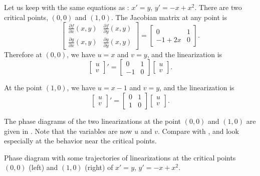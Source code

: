 \begin{example} \label{example:nlin-1b-examplelin}
Let us keep with the same equations as :
$x' = y$, $y' = -x+x^2$.  There are two critical points, $(0,0)$
and $(1,0)$.  The Jacobian matrix at any point is
\begin{equation*}
\begin{bmatrix}
\frac{\partial f}{\partial x}(x,y) &
\frac{\partial f}{\partial y}(x,y) \\
\frac{\partial g}{\partial x}(x,y) &
\frac{\partial g}{\partial y}(x,y)
\end{bmatrix} =
\begin{bmatrix}
0 & 1 \\
-1+2x & 0
\end{bmatrix}.
\end{equation*}
Therefore at $(0,0)$, we have $u=x$ and $v=y$, and the linearization is
\begin{equation*}
\begin{bmatrix} u \\ v \end{bmatrix} ' =
\begin{bmatrix}
0 & 1 \\
-1 & 0
\end{bmatrix}
\begin{bmatrix} u \\ v \end{bmatrix} .
\end{equation*}

At the point $(1,0)$, we have $u=x-1$ and $v=y$, and the linearization is
\begin{equation*}
\begin{bmatrix} u \\ v \end{bmatrix} ' =
\begin{bmatrix}
0 & 1 \\
1 & 0
\end{bmatrix}
\begin{bmatrix} u \\ v \end{bmatrix} .
\end{equation*}

The phase diagrams of the two linearizations at the
point $(0,0)$ and $(1,0)$ are given in .  Note
that the variables are now $u$ and $v$.  Compare
 with , and look especially at the
behavior near the critical points.

\begin{myfig}
\capstart
\caption{Phase diagram with some trajectories of
linearizations at the critical points $(0,0)$ (left) and $(1,0)$ (right) of
$x' = y$, $y' = -x+x^2$. \label{fig:nlin-1b-lin}}
\end{myfig}
\end{example}

